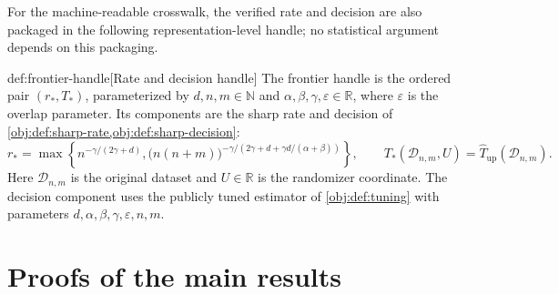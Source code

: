 \documentclass[11pt]{article}
\begin{document}
For the machine-readable crosswalk, the verified rate and decision are also packaged in the following representation-level handle; no statistical argument depends on this packaging.

\begin{definitionv}{def:frontier-handle}[Rate and decision handle]
The frontier handle is the ordered pair \((r_*,T_*)\), parameterized by \(d,n,m\in\mathbb N\) and \(\alpha,\beta,\gamma,\varepsilon\in\mathbb R\), where \(\varepsilon\) is the overlap parameter. Its components are the sharp rate and decision of \cref{obj:def:sharp-rate,obj:def:sharp-decision}:
\[
r_*=
\max\left\{
n^{-\gamma/(2\gamma+d)},
\bigl(n(n+m)\bigr)^{-\gamma/(2\gamma+d+\gamma d/(\alpha+\beta))}
\right\},
\qquad
T_*(\mathcal D_{n,m},U)
=
\widehat T_{\mathrm{up}}(\mathcal D_{n,m}).
\]
Here \(\mathcal D_{n,m}\) is the original dataset and \(U\in\mathbb R\) is the randomizer coordinate. The decision component uses the publicly tuned estimator of \cref{obj:def:tuning} with parameters \(d,\alpha,\beta,\gamma,\varepsilon,n,m\).
\end{definitionv}


\section{Proofs of the main results}\label{sec:deferred-proofs}
\end{document}
